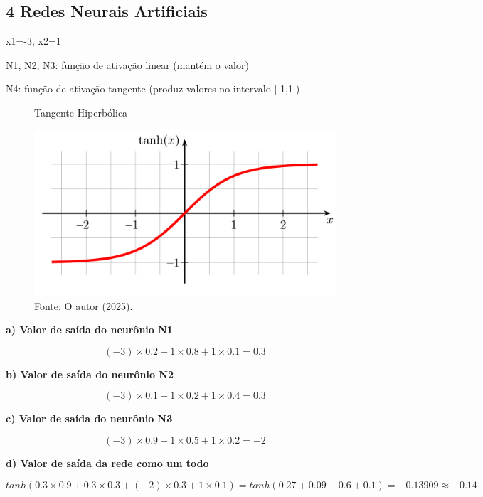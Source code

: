 
\subsection*{\textbf{4 Redes Neurais Artificiais}}

x1=-3, x2=1

N1, N2, N3: função de ativação linear (mantém o valor)

N4: função de ativação tangente (produz valores no intervalo [-1,1])

\begin{figure}[!h]
\centering
\caption{Tangente Hiperbólica}
\includegraphics[width=0.6\linewidth]{apendices/fig/1_IAA001_5.png}
\caption*{Fonte: O autor (2025).}
\label{tanh}
\end{figure}


\begin{adjustwidth}{1em}{}
\textbf{a) Valor de saída do neurônio N1}
\end{adjustwidth}
\begin{equation*}
    (-3)\times0.2 + 1\times0.8 + 1\times0.1 = 0.3
\end{equation*}

\begin{adjustwidth}{1em}{}
\textbf{b) Valor de saída do neurônio N2}
\end{adjustwidth}
\begin{equation*}
    (-3)\times0.1 + 1\times0.2 + 1\times0.4 = 0.3
\end{equation*}

\begin{adjustwidth}{1em}{}
\textbf{c) Valor de saída do neurônio N3}
\end{adjustwidth}
\begin{equation*}
    (-3)\times0.9 + 1\times0.5 + 1\times0.2 = -2
\end{equation*}

\begin{adjustwidth}{1em}{}
\textbf{d) Valor de saída da rede como um todo}
\end{adjustwidth}
\begin{equation*}
    tanh(0.3\times0.9 + 0.3\times0.3 + (-2)\times0.3 + 1\times0.1) = tanh(0.27 + 0.09 - 0.6 + 0.1) = -0.13909 \approx -0.14
\end{equation*}